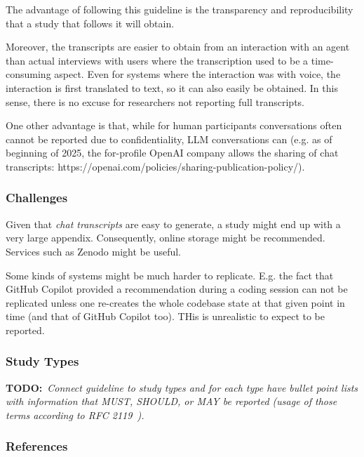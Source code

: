 \documentclass[11pt]{article}
\newcommand{\todo}[1]{{\textbf{TODO:}\ \textit{#1}}} %
\begin{document}
The advantage of following this guideline is the transparency and reproducibility that a study that follows it will obtain. 

Moreover, the transcripts are easier to obtain from an interaction with an agent than actual interviews with users where the transcription used to be a time-consuming aspect. Even for systems where the interaction was with voice, the interaction is first translated to text, so it can also easily be obtained. In this sense, there is no excuse for researchers not reporting full transcripts. 

One other advantage is that, while for human participants conversations often cannot be reported due to confidentiality, LLM conversations can (e.g. as of beginning of 2025, the for-profile OpenAI company allows the sharing of chat transcripts: https://openai.com/policies/sharing-publication-policy/). 


\subsubsection{Challenges}

Given that {\em chat transcripts} are easy to generate, a study might end up with a very large appendix. Consequently, online storage might be recommended. Services such as Zenodo might be useful.

Some kinds of systems might be much harder to replicate. E.g. the fact that GitHub Copilot provided a recommendation during a coding session can not be replicated unless one re-creates the whole codebase state at that given point in time (and that of GitHub Copilot too). THis is unrealistic to expect to be reported. 


\subsubsection{Study Types}

\todo{Connect guideline to study types and for each type have bullet point lists with information that MUST, SHOULD, or MAY be reported (usage of those terms according to RFC 2119~\cite{rfc2119}).}


\subsubsection{References}



\end{document}
